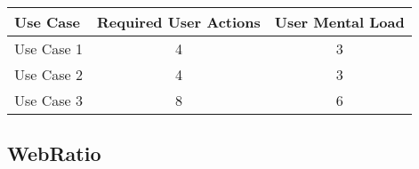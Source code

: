 
\begin{tabularx}{\textwidth}{Xcc}
\textbf{Use Case} & \textbf{Required User Actions} & \textbf{User Mental Load}\\
\hline
Use Case 1                          & 4 & 3 \\
Use Case 2                          & 4 & 3 \\
Use Case 3                          & 8 & 6
\end{tabularx}

\subsection*{WebRatio}





